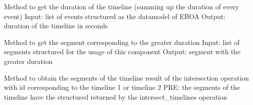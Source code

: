 
\begin{fulllineitems}
\label{\detokenize{eboa.ingestion:eboa.ingestion.functions.get_eboa_timeline_duration}}
Method to get the duration of the timeline (summing up the duration of every event)
Input: list of events structured as the datamodel of EBOA
Output: duration of the timeline in seconds

\end{fulllineitems}


\begin{fulllineitems}
\label{\detokenize{eboa.ingestion:eboa.ingestion.functions.get_greater_segment}}
Method to get the segment corresponding to the greater duration
Input: list of segments structured for the usage of this component
Output: segment with the greater duration

\end{fulllineitems}


\begin{fulllineitems}
\label{\detokenize{eboa.ingestion:eboa.ingestion.functions.get_intersected_timeline_with_idx}}
Method to obtain the segments of the timeline result of the intersection operation with id corresponding to the timeline 1 or timeline 2
PRE: the segments of the timeline have the structured returned by the intersect\_timelines operation

\end{fulllineitems}

